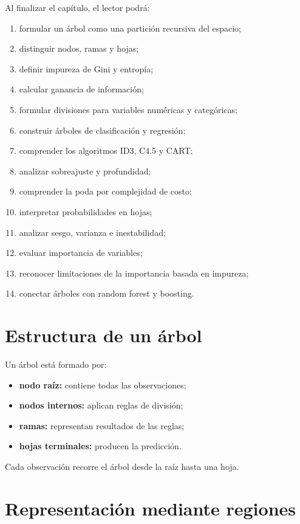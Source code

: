 \documentclass[
  spanish,
  11pt,
  letterpaper,
  DIV=11,
  numbers=noendperiod]{scrreprt}
\providecommand{\tightlist}{%
  \setlength{\itemsep}{0pt}\setlength{\parskip}{0pt}}
\theoremstyle{definition}
\theoremstyle{plain}
\theoremstyle{definition}
\theoremstyle{remark}
\begin{document}
Al finalizar el capítulo, el lector podrá:

\begin{enumerate}
\def\labelenumi{\arabic{enumi}.}
\tightlist
\item
  formular un árbol como una partición recursiva del espacio;
\item
  distinguir nodos, ramas y hojas;
\item
  definir impureza de Gini y entropía;
\item
  calcular ganancia de información;
\item
  formular divisiones para variables numéricas y categóricas;
\item
  construir árboles de clasificación y regresión;
\item
  comprender los algoritmos ID3, C4.5 y CART;
\item
  analizar sobreajuste y profundidad;
\item
  comprender la poda por complejidad de costo;
\item
  interpretar probabilidades en hojas;
\item
  analizar sesgo, varianza e inestabilidad;
\item
  evaluar importancia de variables;
\item
  reconocer limitaciones de la importancia basada en impureza;
\item
  conectar árboles con random forest y boosting.
\end{enumerate}

\section{Estructura de un árbol}\label{estructura-de-un-uxe1rbol}

Un árbol está formado por:

\begin{itemize}
\tightlist
\item
  \textbf{nodo raíz:} contiene todas las observaciones;
\item
  \textbf{nodos internos:} aplican reglas de división;
\item
  \textbf{ramas:} representan resultados de las reglas;
\item
  \textbf{hojas terminales:} producen la predicción.
\end{itemize}

Cada observación recorre el árbol desde la raíz hasta una hoja.

\section{Representación mediante
regiones}\label{representaciuxf3n-mediante-regiones}
\end{document}
